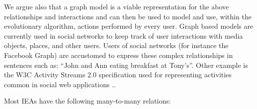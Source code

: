\documentclass[conference]{IEEEtran}
\begin{document}
We argue also
that a graph model is a viable representation for the above relationships and
interactions and can then be used to model and use, within the
evolutionary algorithm, actions performed by every user. Graph based
models are currently used in social networks to keep track  
of user interactions with media objects, places, and other users. Users of
social networks (for instance the Facebook Graph) are accustomed to express these 
complex relationships in sentences such as: ``John and Ann eating breakfast at Tony's''. 
Other example is the W3C Activity Streams 2.0 specification used for representing activities 
common in social web applications \cite{json:streams}..  


Most IEAs have %
the following many-to-many relations:
\end{document}

